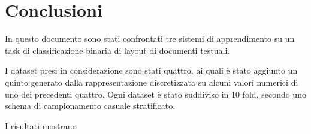 \section{Conclusioni}

In questo documento sono stati confrontati tre sistemi di apprendimento su un task di classificazione binaria di layout di documenti testuali.

I dataset presi in considerazione sono stati quattro, ai quali è stato aggiunto un quinto generato dalla rappresentazione discretizzata su alcuni valori numerici di uno dei precedenti quattro. Ogni dataset è stato suddiviso in 10 fold, secondo uno schema di campionamento casuale stratificato.

I risultati mostrano